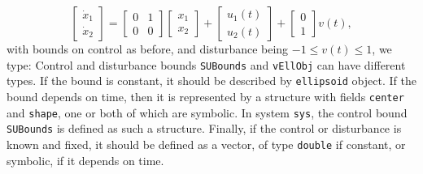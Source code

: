 \[ \left[\begin{array}{cc}
\dot{x}_1\\
\dot{x}_2\end{array}\right] = \left[\begin{array}{cc}
0 & 1\\
0 & 0\end{array}\right]\left[\begin{array}{c}
x_1\\
x_2\end{array}\right] + \left[\begin{array}{c}
u_1(t)\\
u_2(t)\end{array}\right] + \left[\begin{array}{c}
0\\
1\end{array}\right]v(t), \]
with bounds on control as before, and disturbance being $-1\leq v(t)\leq1$,
we type:
Control and disturbance bounds {\tt SUBounds} and {\tt vEllObj} can have different types.
If the bound is constant, it should be described by {\tt ellipsoid} object.
If the bound depends on time, then it is represented by a structure with
fields {\tt center} and {\tt shape}, one or both of which are symbolic.
In system {\tt sys}, the control bound {\tt SUBounds} is defined as such a structure.
Finally, if the control or disturbance is known and fixed, it should be
defined as a vector, of type {\tt double} if constant, or symbolic, if
it depends on time.

